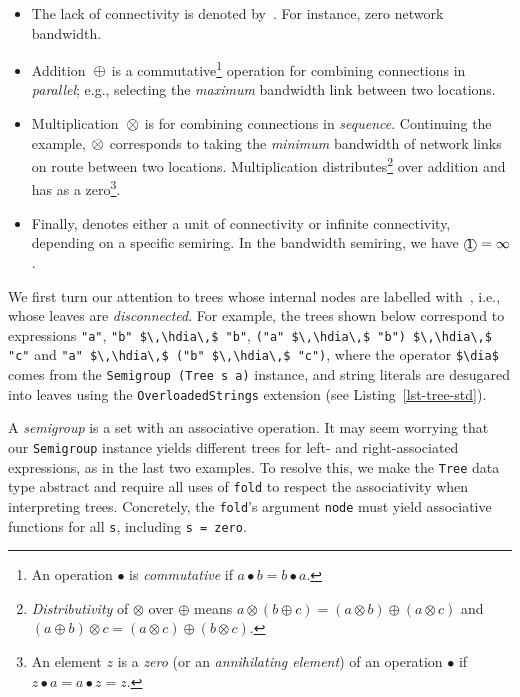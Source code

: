 \documentclass[english,submission]{programming}
\newcommand{\code}[1]{\lstinline[mathescape]|#1|}
\newcommand{\hcode}[1]{{\color{darkblue} \lstinline[keywordstyle={}]|#1|}} %
\newcommand{\hdia}{\,\text{\raisebox{-0.2mm}{\Large\color{darkblue} $\diamond$}}\,}
\newcommand{\add}{\text{\raisebox{-0.1mm}{\large $\oplus$}}}
\newcommand{\mul}{\text{\raisebox{-0.1mm}{\large $\otimes$}}}
\newcommand{\zero}{\raisebox{-0.2mm}{\textcircled{\textsf{0}}}\xspace}
\newcommand{\one}{\raisebox{-0.2mm}{\textcircled{\textsf{\hspace{-0.2mm}1}}}\xspace}
\newcommand{\dia}{\,\text{\raisebox{-0.3mm}{\Large $\diamond$}}\,}
\begin{document}
\vspace{-1mm}
\begin{itemize}
  \item The lack of connectivity is denoted by~\zero. For instance, zero network
        bandwidth.
  \item Addition~$\add$ is a commutative\footnote{
            An operation $\bullet$ is \emph{commutative} if
            $a \bullet b = b \bullet a$.
        } operation for combining connections in \emph{parallel}; e.g.,
        selecting the \emph{maximum} bandwidth link between two locations.
  \item Multiplication~$\mul$ is for combining connections in \emph{sequence}.
        Continuing the example, $\mul$ corresponds to taking the \emph{minimum}
        bandwidth of network links on route between two locations.
        Multiplication distributes\footnote{
            \emph{Distributivity} of $\otimes$ over $\oplus$ means
            $a \otimes (b \oplus c) = (a \otimes b) \oplus (a \otimes c)$ and
            $(a \oplus b) \otimes c = (a \otimes c) \oplus (b \otimes c)$.
        } over addition and has \zero as a zero\footnote{
            An element $z$ is a \emph{zero} (or an \emph{annihilating element})
            of an operation $\bullet$ if $z \bullet a = a \bullet z = z$.
        }.
  \item Finally, \one denotes either a unit of connectivity or infinite
        connectivity, depending on a specific semiring. In the bandwidth
        semiring, we have $\text{\one} = \infty$.
\end{itemize}

\noindent
We first turn our attention to trees whose internal nodes are labelled
with~\zero, i.e., whose leaves are \emph{disconnected}. For example, the trees
shown below correspond to expressions \code{"a"}, \code{"b" $\,\hdia\,$ "b"},
\code{("a" $\,\hdia\,$ "b") $\,\hdia\,$ "c"} and
\code{"a" $\,\hdia\,$ ("b" $\,\hdia\,$ "c")}, where the operator \code{$\dia$}
comes from the \code{Semigroup (Tree s a)} instance, and string literals are
desugared into leaves using the \code{OverloadedStrings} extension
(see Listing~\ref{lst-tree-std}).

\vspace{2.2mm}
\hfill\hfill
\vspace{2.3mm}

\noindent
A \emph{semigroup} is a set with an associative operation. It may seem worrying
that our \code{Semigroup} instance yields different trees for left- and
right-associated expressions, as in the last two examples. To resolve this, we
make the \code{Tree} data type abstract and require all uses of \hcode{fold} to
respect the associativity when interpreting trees. Concretely, the
\hcode{fold}'s argument \hcode{node} must yield associative functions for all
\hcode{s}, including \hcode{s = zero}.
\end{document}
